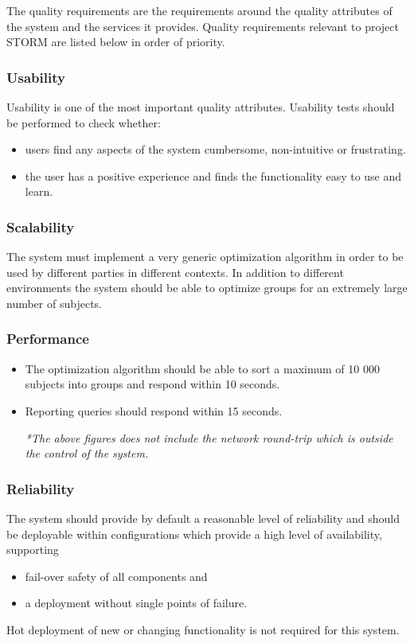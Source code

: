 The quality requirements are the requirements around the quality attributes of the system and
the services it provides. Quality requirements relevant to project STORM are listed below in order of priority. \par

\subsubsection{Usability} \label{3.2.1}
Usability is one of the most important quality attributes. Usability tests should be performed to check whether:
\begin{itemize}
\item users find any aspects of the system cumbersome, non-intuitive or frustrating.
\item the user has a positive experience and finds the functionality easy to use and learn.
\end{itemize}

\subsubsection{Scalability} \label{3.2.2}
The system must implement a very generic optimization algorithm in order to be used by different parties in different contexts. In addition to different environments the system should be able to optimize groups for an extremely large number of subjects.

\subsubsection{Performance} \label{3.2.3}
\begin{itemize}
\item The optimization algorithm should be able to sort a maximum of 10 000 subjects into groups and respond within 10 seconds.
\item Reporting queries should respond within 15 seconds. \par
\textit {*The above figures does not include the network round-trip which is outside the control of the system.}
\end{itemize}

\subsubsection{Reliability} \label{3.2.4}
The system should provide by default a reasonable level of reliability and should be deployable within configurations which provide a high level of availability, supporting
\begin{itemize}
\item fail-over safety of all components and
\item a deployment without single points of failure.
\end{itemize}
Hot deployment of new or changing functionality is not required for this system.

